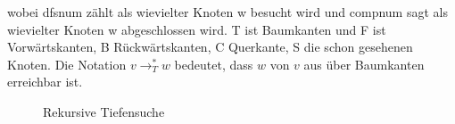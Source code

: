                         wobei dfsnum zählt als wievielter Knoten w besucht wird und compnum sagt als wievielter Knoten w abgeschlossen wird. T ist Baumkanten und F ist Vorwärtskanten, B Rückwärtskanten, C Querkante, S die schon gesehenen Knoten. Die Notation $v \rightarrow_T^* w$ bedeutet, dass $w$ von $v$ aus über Baumkanten erreichbar ist.
                        
                        \begin{figure}[htp]
                            \centering
                            \capstart
                            
                            \caption{Rekursive Tiefensuche}
                            \label{fig:dfsrecursive}
                        \end{figure}
                        
